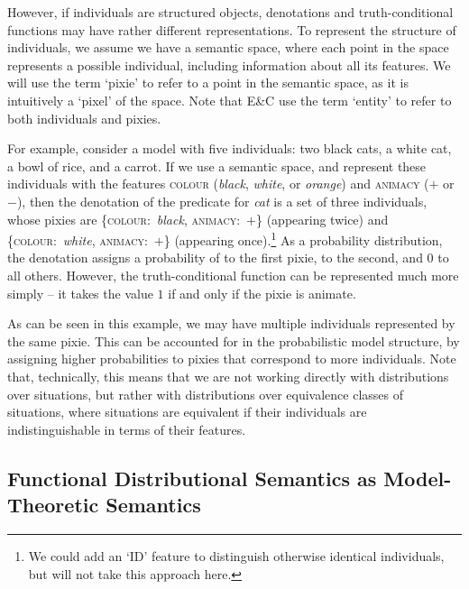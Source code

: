 \documentclass[a4paper,11pt]{article}
\begin{document}
However, if individuals are structured objects,
denotations and truth-conditional functions may have rather different representations.
To represent the structure of individuals, we assume we have a semantic space,
where each point in the space represents a possible individual,
including information about all its features.
We will use the term `pixie' to refer to a point in the semantic space,
as it is intuitively a `pixel' of the space.
Note that E\&C use the term `entity' to refer to both individuals and pixies.

For example, consider a model with five individuals:
two black cats, a white cat, a bowl of rice, and a carrot.
If we use a semantic space, and represent these individuals with the features
\textsc{colour} (\textit{black}, \textit{white}, or \textit{orange})
and \textsc{animacy} ($+$ or $-$),
then the denotation of the predicate for \textit{cat} is a set of three individuals,
whose pixies are
\{\textsc{colour}:~\textit{black}, \textsc{animacy}:~$+$\} (appearing twice) and
\{\textsc{colour}:~\textit{white}, \textsc{animacy}:~$+$\} (appearing once).\footnote{%
  We could add an `ID' feature to distinguish otherwise identical individuals,
  but will not take this approach here.
}
As a probability distribution,
the denotation assigns a probability of  to the first pixie,
 to the second,
and $0$ to all others.
However, the truth-conditional function can be represented much more simply --
it takes the value $1$ if and only if the pixie is animate.

As can be seen in this example,
we may have multiple individuals represented by the same pixie.
This can be accounted for in the probabilistic model structure,
by assigning higher probabilities to pixies that correspond to more individuals.
Note that, technically, this means that we are not working directly with distributions over situations,
but rather with distributions over equivalence classes of situations,
where situations are equivalent if their individuals are indistinguishable in terms of their features.



\subsection{Functional Distributional Semantics as Model-Theoretic Semantics}
\label{sec:sem-func}
\end{document}
